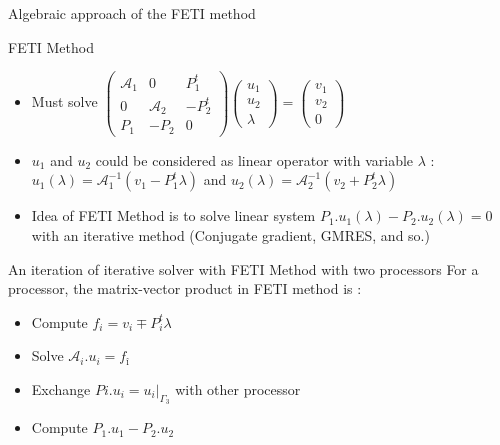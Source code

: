 \documentclass[compress,10pt,aspectratio=169]{beamer}
\begin{document}
\begin{frame}[fragile]{Algebraic approach of the FETI method}
  \scriptsize
  \begin{block}{\small FETI Method}
    \begin{itemize}
      \item Must solve
      $
      \left(\begin{array}{ccc}
        \mathcal{A}_{1} & 0 & P_{1}^{t} \\
        0 & \mathcal{A}_{2} & -P_{2}^{t} \\
        P_{1} & -P_{2} & 0
      \end{array}\right)
      \left(\begin{array}{c} u_{1} \\ u_{2} \\ \lambda \end{array}\right) =
      \left(\begin{array}{c} v_{1} \\ v_{2} \\ 0 \end{array}\right)
      $
      \item $u_{1}$ and $u_{2}$ could be considered as linear operator with variable $\lambda$ :
      $u_{1}(\lambda) = \mathcal{A}_{1}^{-1}\left(v_{1} - P_{1}^{t}\lambda\right)$ and
      $u_{2}(\lambda) = \mathcal{A}_{2}^{-1}\left(v_{2} + P_{2}^{t}\lambda\right)$
      \item Idea of FETI Method is to solve linear system $P_{1}.u_{1}(\lambda) -P_{2}.u_{2}(\lambda) = 0$ with an iterative method (Conjugate gradient, GMRES, and so.)
    \end{itemize}
  \end{block}

  \begin{exampleblock}{\small An iteration of iterative solver with FETI Method with two processors}
    For a processor, the matrix-vector product in FETI method is :
    \begin{itemize}
      \item Compute $f_{i} = v_{i} \mp P_{i}^{t}\lambda$
      \item Solve $\mathcal{A}_{i}.u_{i} = f_{î}$
      \item Exchange $P{i}.u_{i} = u_{i}|_{\Gamma_{3}}$ with other processor
      \item Compute $P_{1}.u_{1} - P_{2}.u_{2}$
    \end{itemize}
  \end{exampleblock}
\end{frame}
\end{document}
